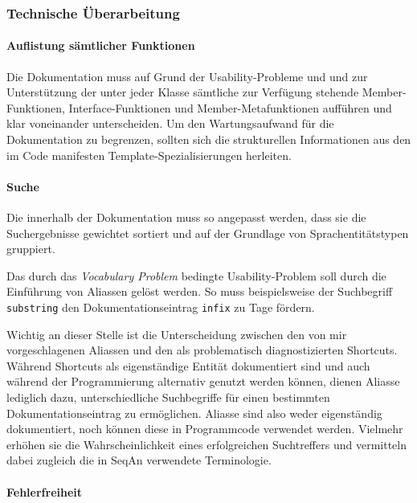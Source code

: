 \subsubsection{Technische Überarbeitung}

\paragraph{Auflistung sämtlicher Funktionen}
Die Dokumentation muss auf Grund der Usability-Probleme  und  und zur Unterstützung der   unter jeder Klasse sämtliche zur Verfügung stehende Member-Funktionen, Interface-Funktionen und Member-Metafunktionen aufführen und klar voneinander unterscheiden. Um den Wartungsaufwand für die Dokumentation zu begrenzen, sollten sich die strukturellen Informationen aus den im Code manifesten Template-Spezialisierungen herleiten.

\paragraph{Suche}
Die  innerhalb der Dokumentation muss so angepasst werden, dass sie die Suchergebnisse gewichtet sortiert und auf der Grundlage von Sprachentitätstypen gruppiert.

Das durch das \textit{Vocabulary Problem} bedingte Usability-Problem  soll durch die Einführung von Aliassen gelöst werden. So muss beispielsweise der Suchbegriff \texttt{substring} den Dokumentationseintrag \texttt{infix} zu Tage fördern.

Wichtig an dieser Stelle ist die Unterscheidung zwischen den von mir vorgeschlagenen Aliassen und den als problematisch diagnostizierten Shortcuts. Während Shortcuts als eigenständige Entität dokumentiert sind und auch während der Programmierung alternativ genutzt werden können, dienen Aliasse lediglich dazu, unterschiedliche Suchbegriffe für einen bestimmten Dokumentationseintrag zu ermöglichen. Aliasse sind also weder eigenständig dokumentiert, noch können diese in Programmcode verwendet werden. Vielmehr erhöhen sie die Wahrscheinlichkeit eines erfolgreichen Suchtreffers und vermitteln dabei zugleich die in SeqAn verwendete Terminologie.

\paragraph{Fehlerfreiheit}

